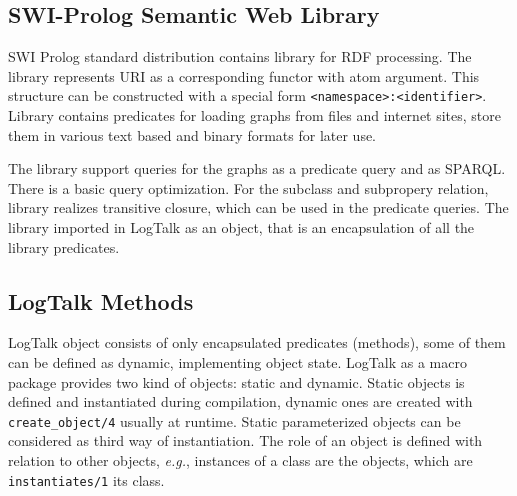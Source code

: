 \documentclass[conference]{IEEEtran}
\begin{document}




\subsection{SWI-Prolog Semantic Web Library}
\label{sec:swi-sw}

SWI Prolog standard distribution contains library for RDF processing.  The library represents URI as a corresponding functor with atom argument. This structure can be constructed with a special form \texttt{<namespace>:<identifier>}.  Library contains predicates for loading graphs from files and internet sites, store them in various text based and binary formats for later use.

The library support queries for the graphs as a predicate query and as SPARQL.  There is a basic query optimization.  For the subclass and subpropery relation, library realizes transitive closure, which can be used in the predicate queries.  The library imported in LogTalk as an object, that is an encapsulation of all the library predicates.

\subsection{LogTalk Methods}
\label{sec:lgt-methods}

LogTalk object consists of only encapsulated predicates (methods), some of them can be defined as dynamic, implementing object state.  LogTalk as a macro package provides two kind of objects: static and dynamic.  Static objects is defined and instantiated during compilation, dynamic ones are created with \texttt{create\_object/4} usually at runtime.  Static parameterized objects can be considered as third way of instantiation.  The role of an object is defined with relation to other objects, \emph{e.g.}, instances of a class are the objects, which are \verb|instantiates/1| its class.
\end{document}
